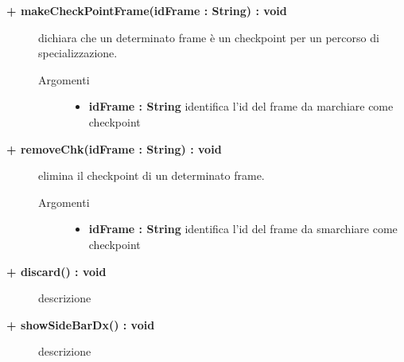 \begin{description}
	\begin{description}
		\item[\textbf{\color{blue}+ makeCheckPointFrame(idFrame : String) : void			}] \hfill
			dichiara che un determinato frame è un checkpoint per un percorso di specializzazione.
			
		\begin{description}
			\item[Argomenti] \hfill
				\begin{itemize}
				
					\item \textbf{idFrame : String			} \hfill
						identifica l'id del frame da marchiare come checkpoint
					
				\end{itemize}
		\end{description}
	\end{description}
	
	\begin{description}
		\item[\textbf{\color{blue}+ removeChk(idFrame : String) : void			}] \hfill
			elimina il checkpoint di un determinato frame.
			
		\begin{description}
			\item[Argomenti] \hfill
				\begin{itemize}
				
					\item \textbf{idFrame : String			} \hfill
						identifica l'id del frame da smarchiare come checkpoint
					
				\end{itemize}
		\end{description}
	\end{description}
	
	\begin{description}
		\item[\textbf{\color{blue}+ discard() : void			}] \hfill
			descrizione %
	\end{description}
	
	\begin{description}
		\item[\textbf{\color{blue}+ showSideBarDx() : void			}] \hfill
			descrizione %
			

\end{description}
\end{description}
